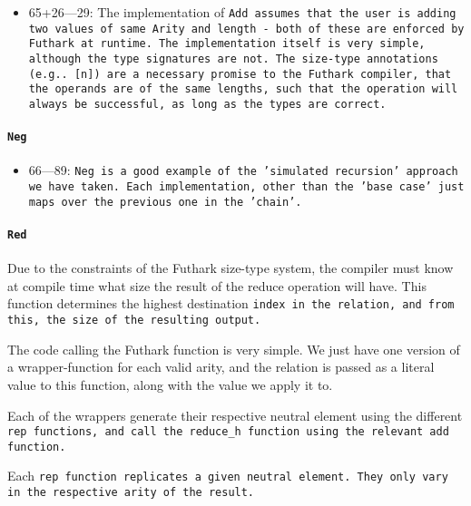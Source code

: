 \begin{itemize}
	\item 65+26---29: The implementation of \tt{Add} assumes that the
	user is adding two values of same \tt{Arity} and length - both of
	these are enforced by Futhark at runtime. The implementation
	itself is very simple, although the type signatures are not. The
	size-type annotations (e.g.. \tt{[n]}) are a necessary promise to the
	Futhark compiler, that the operands are of the same lengths,
	such that the operation will always be successful, as long as the
	types are correct.
\end{itemize}

\paragraph{\tt{Neg}}



\begin{itemize}
	\item 66---89: \tt{Neg} is a good example of the 'simulated
	recursion' approach we have taken. Each implementation, other
	than the 'base case' just maps over the previous one in the
	'chain'.
\end{itemize}

\paragraph{\tt{Red}}

Due to the constraints of the Futhark size-type system, the compiler
must know at compile time what size the result of the reduce operation
will have. This function determines the highest destination \tt{index}
in the relation, and from this, the size of the resulting output.

The code calling the Futhark function is very simple. We just have
one version of a wrapper-function for each valid arity, and the relation
is passed as a literal value to this function, along with the value we
apply it to.

Each of the wrappers generate their respective neutral element using
the different \tt{rep} functions, and call the \tt{reduce\_h} function
using the relevant \tt{add} function.

Each \tt{rep} function replicates a given neutral element. They only vary
in the respective arity of the result.

